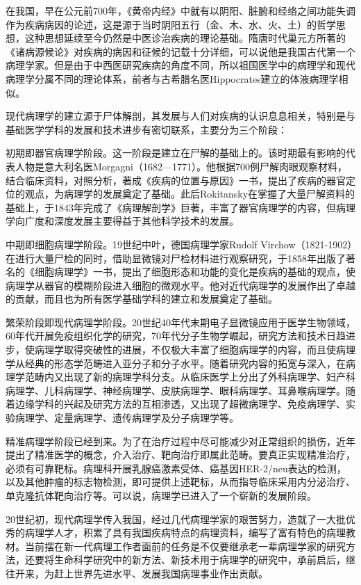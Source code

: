 在我国，早在公元前700年，《黄帝内经》中就有以阴阳、脏腑和经络之间功能失调作为疾病病因的论述，这是源于当时阴阳五行（金、木、水、火、土）的哲学思想，这种思想延续至今仍然是中医诊治疾病的理论基础。隋唐时代巢元方所著的《诸病源候论》对疾病的病因和征候的记载十分详细，可以说他是我国古代第一个病理学家。但是由于中西医研究疾病的角度不同，所以祖国医学中的病理学和现代病理学分属不同的理论体系，前者与古希腊名医Hippocrates建立的体液病理学相似。

现代病理学的建立源于尸体解剖，其发展与人们对疾病的认识息息相关，特别是与基础医学学科的发展和技术进步有密切联系，主要分为三个阶段：

初期即器官病理学阶段。这一阶段是建立在尸解的基础上的。该时期最有影响的代表人物是意大利名医Morgagni（1682---1771）。他根据700例尸解肉眼观察材料，结合临床资料，对照分析，著成《疾病的位置与原因》一书，提出了疾病的器官定位的观点，为病理学的发展奠定了基础。此后Rokitansky在掌握了大量尸解资料的基础上，于1843年完成了《病理解剖学》巨著，丰富了器官病理学的内容，但病理学向广度和深度发展主要得益于其他科学技术的发展。

中期即细胞病理学阶段。19世纪中叶，德国病理学家Rudolf
Virchow（1821-1902）在进行大量尸检的同时，借助显微镜对尸检材料进行观察研究，于1858年出版了著名的《细胞病理学》一书，提出了细胞形态和功能的变化是疾病的基础的观点，使病理学从器官的模糊阶段进入细胞的微观水平。他对近代病理学的发展作出了卓越的贡献，而且也为所有医学基础学科的建立和发展奠定了基础。

繁荣阶段即现代病理学阶段。20世纪40年代末期电子显微镜应用于医学生物领域，60年代开展免疫组织化学的研究，70年代分子生物学崛起，研究方法和技术日趋进步，使病理学取得突破性的进展，不仅极大丰富了细胞病理学的内容，而且使病理学从经典的形态学范畴进入亚分子和分子水平。随着研究内容的拓宽与深入，在病理学范畴内又出现了新的病理学科分支。从临床医学上分出了外科病理学、妇产科病理学、儿科病理学、神经病理学、皮肤病理学、眼科病理学、耳鼻喉病理学。随着边缘学科的兴起及研究方法的互相渗透，又出现了超微病理学、免疫病理学、实验病理学、定量病理学、遗传病理学及分子病理学等。

精准病理学阶段已经到来。为了在治疗过程中尽可能减少对正常组织的损伤，近年提出了精准医学的概念，介入治疗、靶向治疗即属此范畴。要真正实现精准治疗，必须有可靠靶标。病理科开展乳腺癌激素受体、癌基因HER-2/neu表达的检测，以及其他肿瘤的标志物检测，即可提供上述靶标，从而指导临床采用内分泌治疗、单克隆抗体靶向治疗等。可以说，病理学已进入了一个崭新的发展阶段。

20世纪初，现代病理学传入我国，经过几代病理学家的艰苦努力，造就了一大批优秀的病理学人才，积累了具有我国疾病特点的病理资料，编写了富有特色的病理教材。当前摆在新一代病理工作者面前的任务是不仅要继承老一辈病理学家的研究方法，还要将生命科学研究中的新方法、新技术用于病理学的研究中，承前启后，继往开来，为赶上世界先进水平、发展我国病理事业作出贡献。